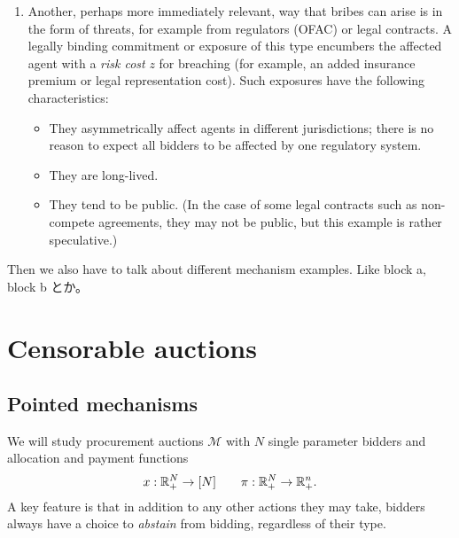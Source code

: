 \begin{enumerate}
  \item
    Another, perhaps more immediately relevant, way that bribes can arise is in the form of threats, for example from regulators (OFAC) or legal contracts.
    A legally binding commitment or exposure of this type encumbers the affected agent with a \emph{risk cost} $z$ for breaching (for example, an added insurance premium or legal representation cost).
    Such exposures have the following characteristics:
    \begin{itemize}
      \item They asymmetrically affect agents in different jurisdictions; there is no reason to expect all bidders to be affected by one regulatory system.
      \item They are long-lived.
      \item They tend to be public. (In the case of some legal contracts such as non-compete agreements, they may not be public, but this example is rather speculative.)
    \end{itemize}

\end{enumerate}

Then we also have to talk about different mechanism examples.
%
Like block a, block b とか。


\newpage
\section{Censorable auctions}

\subsection{Pointed mechanisms}

We will study procurement auctions $\mathcal{M}$ with $N$ single parameter bidders and allocation and payment functions 
\[
  x: \mathbb{R}_+^N\rightarrow [N] \qquad \pi:\mathbb{R}_+^N\rightarrow \mathbb{R}_+^n.
\]
%
A key feature is that in addition to any other actions they may take, bidders always have a choice to \emph{abstain} from bidding, regardless of their type.

